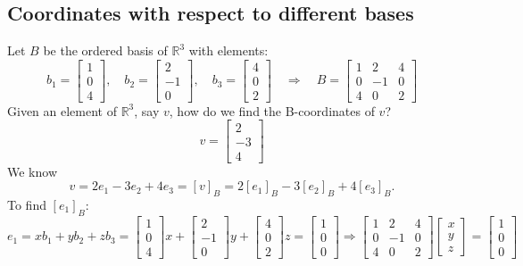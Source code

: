 \documentclass[a4paper, 9pt]{extarticle}
\begin{document}
\subsection{Coordinates with respect to different bases}
Let $B$ be the ordered basis of $\mathbb{R}^3$ with elements:
$$b_1 = \begin{bmatrix}
    1 \\
    0 \\
    4
  \end{bmatrix}, \quad
  b_2 = \begin{bmatrix}
    2  \\
    -1 \\
    0
  \end{bmatrix}, \quad
  b_3 = \begin{bmatrix}
    4 \\
    0 \\
    2
  \end{bmatrix}
  \quad\Longrightarrow\quad
  B = \begin{bmatrix}
    1 & 2  & 4 \\
    0 & -1 & 0 \\
    4 & 0  & 2
  \end{bmatrix}
$$
Given an element of $\mathbb{R}^3$, say $v$, how do we find the B-coordinates of $v$?
$$
  v = \begin{bmatrix}
    2  \\
    -3 \\
    4
  \end{bmatrix}
$$
We know
$$v = 2e_1 - 3e_2 + 4e_3 = [v]_B = 2[e_1]_B - 3[e_2]_B + 4[e_3]_B.$$
To find $[e_1]_B$:
$$e_1 = xb_1 + yb_2 + zb_3 =
  \begin{bmatrix}
    1 \\
    0 \\
    4
  \end{bmatrix}x +
  \begin{bmatrix}
    2  \\
    -1 \\
    0
  \end{bmatrix}y +
  \begin{bmatrix}
    4 \\
    0 \\
    2
  \end{bmatrix}z
  =
  \begin{bmatrix}
    1 \\
    0 \\
    0
  \end{bmatrix}
  \Longrightarrow
  \begin{bmatrix}
    1 & 2  & 4 \\
    0 & -1 & 0 \\
    4 & 0  & 2
  \end{bmatrix}
  \begin{bmatrix}
    x \\
    y \\
    z
  \end{bmatrix}
  =
  \begin{bmatrix}
    1 \\
    0 \\
    0
  \end{bmatrix}
$$
\end{document}

